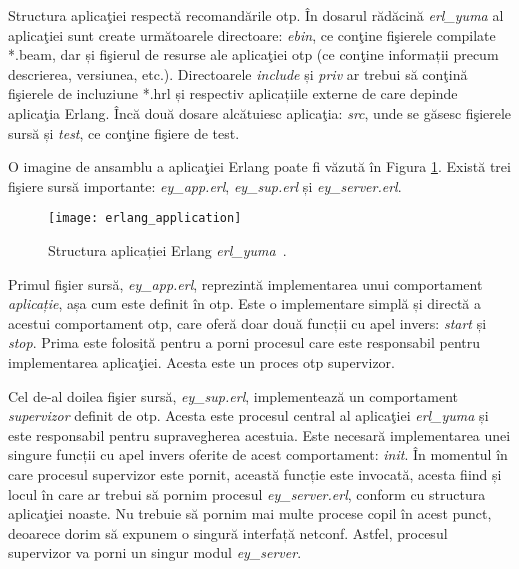 Structura aplicaţiei respectă recomandările \gls{otp}. În dosarul rădăcină \textit{erl\_yuma} al aplicaţiei sunt create următoarele directoare: \textit{ebin}, ce conţine fişierele compilate *.beam, dar și fişierul de resurse ale aplicaţiei \gls{otp} (ce conţine informații precum descrierea, versiunea, etc.). Directoarele \textit{include} și \textit{priv} ar trebui să conţină fişierele de incluziune *.hrl și respectiv aplicațiile externe de care depinde aplicaţia Erlang. Încă două dosare alcătuiesc aplicaţia: \textit{src}, unde se găsesc fişierele sursă și \textit{test}, ce conţine fişiere de test.

O imagine de ansamblu a aplicaţiei Erlang poate fi văzută în Figura \ref{fig:erlang_application}. Există trei fişiere sursă importante: \textit{ey\_app.erl}, \textit{ey\_sup.erl} și \textit{ey\_server.erl}.

\begin{figure}[h]
	\centering
	\texttt{[image: erlang\_application]}
	\caption{Structura aplicației Erlang \textit{erl\_yuma}~\cite{linc2014qsg}.}
	\label{fig:erlang_application}
\end{figure}

Primul fişier sursă, \textit{ey\_app.erl}, reprezintă implementarea unui comportament \textit{aplicație}, așa cum este definit în \gls{otp}. Este o implementare simplă și directă a acestui comportament \gls{otp}, care oferă doar două funcții cu apel invers: \textit{start} și \textit{stop}. Prima este folosită pentru a porni procesul care este responsabil pentru implementarea aplicaţiei. Acesta este un proces \gls{otp} supervizor.

Cel de-al doilea fişier sursă, \textit{ey\_sup.erl}, implementează un comportament \textit{supervizor} definit de \gls{otp}. Acesta este procesul central al aplicaţiei \textit{erl\_yuma} și este responsabil pentru supravegherea acestuia. Este necesară implementarea unei singure funcții cu apel invers oferite de acest comportament: \textit{init}. În momentul în care procesul supervizor este pornit, această funcție este invocată, acesta fiind și locul în care ar trebui să pornim procesul \textit{ey\_server.erl}, conform cu structura aplicaţiei noaste. Nu trebuie să pornim mai multe procese copil în acest punct, deoarece dorim să expunem o singură interfață \gls{netconf}. Astfel, procesul supervizor va porni un singur modul \textit{ey\_server}.

